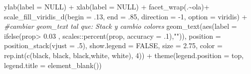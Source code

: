 \documentclass[
  12pt,
]{book}
\newenvironment{Shaded}{\begin{snugshade}}{\end{snugshade}}
\newcommand{\AttributeTok}[1]{\textcolor[rgb]{0.77,0.63,0.00}{#1}}
\newcommand{\CommentTok}[1]{\textcolor[rgb]{0.56,0.35,0.01}{\textit{#1}}}
\newcommand{\ConstantTok}[1]{\textcolor[rgb]{0.00,0.00,0.00}{#1}}
\newcommand{\DecValTok}[1]{\textcolor[rgb]{0.00,0.00,0.81}{#1}}
\newcommand{\FloatTok}[1]{\textcolor[rgb]{0.00,0.00,0.81}{#1}}
\newcommand{\FunctionTok}[1]{\textcolor[rgb]{0.00,0.00,0.00}{#1}}
\newcommand{\NormalTok}[1]{#1}
\newcommand{\SpecialCharTok}[1]{\textcolor[rgb]{0.00,0.00,0.00}{#1}}
\newcommand{\StringTok}[1]{\textcolor[rgb]{0.31,0.60,0.02}{#1}}
\begin{document}
\begin{Shaded}
\begin{Highlighting}[]
  \FunctionTok{ylab}\NormalTok{(}\AttributeTok{label =} \ConstantTok{NULL}\NormalTok{) }\SpecialCharTok{+}
  \FunctionTok{xlab}\NormalTok{(}\AttributeTok{label =} \ConstantTok{NULL}\NormalTok{) }\SpecialCharTok{+}
  \FunctionTok{facet\_wrap}\NormalTok{(.}\SpecialCharTok{\textasciitilde{}}\NormalTok{ola)}\SpecialCharTok{+}
  \FunctionTok{scale\_fill\_viridis\_d}\NormalTok{(}\AttributeTok{begin =}\NormalTok{ .}\DecValTok{13}\NormalTok{, }\AttributeTok{end =}\NormalTok{ .}\DecValTok{85}\NormalTok{, }\AttributeTok{direction =} \SpecialCharTok{{-}}\DecValTok{1}\NormalTok{, }\AttributeTok{option =} \StringTok{\textquotesingle{}viridis\textquotesingle{}}\NormalTok{) }\SpecialCharTok{+}
  \CommentTok{\#cambiar geom\_text tal que: Stack y cambio colores}
  \FunctionTok{geom\_text}\NormalTok{(}\FunctionTok{aes}\NormalTok{(}\AttributeTok{label =} \FunctionTok{ifelse}\NormalTok{(prop}\SpecialCharTok{\textgreater{}} \FloatTok{0.03}\NormalTok{ , scales}\SpecialCharTok{::}\FunctionTok{percent}\NormalTok{(prop, }\AttributeTok{accuracy =}\NormalTok{ .}\DecValTok{1}\NormalTok{),}\StringTok{""}\NormalTok{)), }\AttributeTok{position =} \FunctionTok{position\_stack}\NormalTok{(}\AttributeTok{vjust =}\NormalTok{ .}\DecValTok{5}\NormalTok{),}
            \AttributeTok{show.legend =} \ConstantTok{FALSE}\NormalTok{,}
            \AttributeTok{size =} \FloatTok{2.75}\NormalTok{,}
            \AttributeTok{color =} \FunctionTok{rep.int}\NormalTok{(}\FunctionTok{c}\NormalTok{(}\StringTok{\textquotesingle{}black\textquotesingle{}}\NormalTok{, }\StringTok{\textquotesingle{}black\textquotesingle{}}\NormalTok{, }\StringTok{\textquotesingle{}black\textquotesingle{}}\NormalTok{,}\StringTok{\textquotesingle{}white\textquotesingle{}}\NormalTok{, }\StringTok{\textquotesingle{}white\textquotesingle{}}\NormalTok{), }\DecValTok{4}\NormalTok{)) }\SpecialCharTok{+} 
  \FunctionTok{theme}\NormalTok{(}\AttributeTok{legend.position =} \StringTok{\textquotesingle{}top\textquotesingle{}}\NormalTok{,}
        \AttributeTok{legend.title =} \FunctionTok{element\_blank}\NormalTok{())}
\end{Highlighting}
\end{Shaded}
\end{document}
